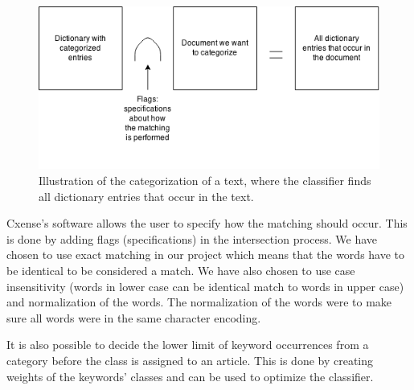 \begin{figure}[h]
\centering
\includegraphics[width=\textwidth]{Chapters/Background/Cxense_matching}
\caption[Illustration of entry matching process]{Illustration of the categorization of a text, where the classifier finds all dictionary entries that occur in the text. }
\label{fig:cxensematching}
\end{figure}

Cxense's software allows the user to specify how the matching should occur. This is done by adding flags (specifications) in the intersection process. We have chosen to use exact matching in our project which means that the words have to be identical to be considered a match. We have also chosen to use case insensitivity (words in lower case can be identical match to words in upper case) and normalization of the words. The normalization of the words were to make sure all words were in the same character encoding. 

It is also possible to decide the lower limit of keyword occurrences from a category before the class is assigned to an article. This is done by creating weights of the keywords' classes and can be used to optimize the classifier.



